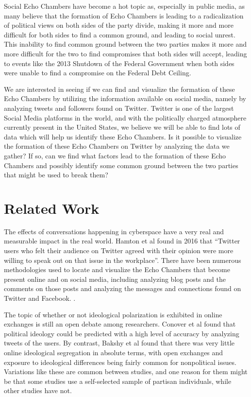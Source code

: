 \documentclass[journal]{IEEEtran}
\begin{document}
	Social Echo Chambers have become a hot topic as, especially in public media, as many believe that the formation of Echo Chambers is leading to a radicalization of political views on both sides of the party divide, making it more and more difficult for both sides to find a common ground, and leading to social unrest. This inability to find common ground between the two parties makes it more and more difficult for the two to find compromises that both sides will accept, leading to events like the 2013 Shutdown of the Federal Government when both sides were unable to find a compromise on the Federal Debt Ceiling. 
	
	We are interested in seeing if we can find and visualize the formation of these Echo Chambers by utilizing the information available on social media, namely by analyzing tweets and followers found on Twitter. Twitter is one of the largest Social Media platforms in the world, and with the politically charged atmosphere currently present in the United States, we believe we will be able to find lots of data which will help us identify these Echo Chambers. Is it possible to visualize the formation of these Echo Chambers on Twitter by analyzing the data we gather? If so, can we find what factors lead to the formation of these Echo Chambers and possibly identify some common ground between the two parties that might be used to break them? 
	
	\section{Related Work}
	
	The effects of conversations happening in cyberspace have a very real and measurable impact in the real world. Hamton et al found in 2016 that “Twitter users who felt their audience on Twitter agreed with their opinion were more willing to speak out on that issue in the workplace”. There have been numerous methodologies used to locate and visualize the Echo Chambers that become present online and on social media, including analyzing blog posts and the comments on those posts and analyzing the messages and connections found on Twitter and Facebook. .
	
	The topic of whether or not ideological polarization is exhibited in online exchanges is still an open debate among researchers. Conover et al found that political ideology could be predicted with a high level of accuracy by analyzing tweets of the users. By contrast, Bakshy et al found that there was very little online ideological segregation in absolute terms, with open exchanges and exposure to ideological differences being fairly common for nonpolitical issues. Variations like these are common between studies, and one reason for them might be that some studies use a self-selected sample of partisan individuals, while other studies have not. 
	
\end{document}

